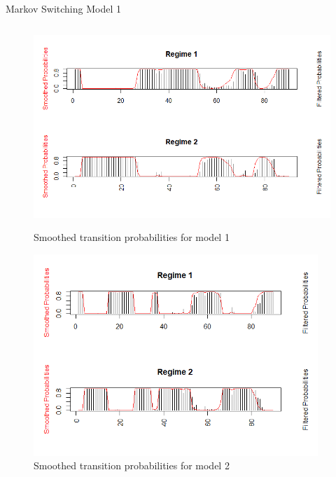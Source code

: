 \documentclass{article}
\begin{document}
\begin{table}
	\centering
	\caption{Markov Switching Model 1}
	\hline
	
	\hline
\end{table}

\begin{figure}[htbp]
	\begin{center}
		\includegraphics[height=3in]{prob.png}
		\caption{Smoothed transition probabilities for model 1}
	\end{center}
\end{figure}
\begin{figure}[htbp]
	\begin{center}
		\includegraphics[height=3in]{regimes_model2.png}
		\caption{Smoothed transition probabilities for model 2}
	\end{center}
\end{figure}





\end{document}
